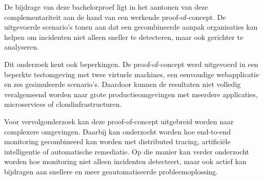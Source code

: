 De bijdrage van deze bachelorproef ligt in het aantonen van deze complementariteit aan de hand van een werkende proof-of-concept. De uitgevoerde scenario’s tonen aan dat een gecombineerde aanpak organisaties kan helpen om incidenten niet alleen sneller te detecteren, maar ook gerichter te analyseren.

Dit onderzoek kent ook beperkingen. De proof-of-concept werd uitgevoerd in een beperkte testomgeving met twee virtuele machines, een eenvoudige webapplicatie en zes gesimuleerde scenario’s. Daardoor kunnen de resultaten niet volledig veralgemeend worden naar grote productieomgevingen met meerdere applicaties, microservices of cloudinfrastructuren.

Voor vervolgonderzoek kan deze proof-of-concept uitgebreid worden naar complexere omgevingen. Daarbij kan onderzocht worden hoe end-to-end monitoring gecombineerd kan worden met distributed tracing, artificiële intelligentie of automatische remediatie. Op die manier kan verder onderzocht worden hoe monitoring niet alleen incidenten detecteert, maar ook actief kan bijdragen aan snellere en meer geautomatiseerde probleemoplossing.

